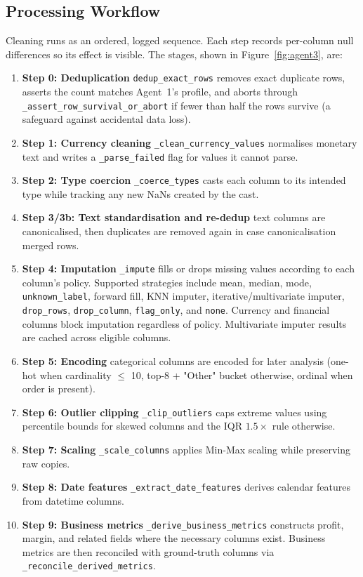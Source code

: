 \documentclass[12pt,a4paper,openany]{report}
\begin{document}
\subsection{Processing Workflow}
Cleaning runs as an ordered, logged sequence. Each step records per-column null differences so its effect is visible. The stages, shown in Figure~\ref{fig:agent3}, are:
\begin{enumerate}
	\item \textbf{Step 0: Deduplication} \texttt{dedup\_exact\_rows} removes exact duplicate rows, asserts the count matches Agent~1's profile, and aborts through \texttt{\_assert\_row\_survival\_or\_abort} if fewer than half the rows survive (a safeguard against accidental data loss).
	\item \textbf{Step 1: Currency cleaning} \texttt{\_clean\_currency\_values} normalises monetary text and writes a \texttt{\_parse\_failed} flag for values it cannot parse.
	\item \textbf{Step 2: Type coercion} \texttt{\_coerce\_types} casts each column to its intended type while tracking any new NaNs created by the cast.
	\item \textbf{Step 3/3b: Text standardisation and re-dedup} text columns are canonicalised, then duplicates are removed again in case canonicalisation merged rows.
	\item \textbf{Step 4: Imputation} \texttt{\_impute} fills or drops missing values according to each column's policy. Supported strategies include mean, median, mode, \texttt{unknown\_label}, forward fill, KNN imputer, iterative/multivariate imputer, \texttt{drop\_rows}, \texttt{drop\_column}, \texttt{flag\_only}, and \texttt{none}. Currency and financial columns block imputation regardless of policy. Multivariate imputer results are cached across eligible columns.
	\item \textbf{Step 5: Encoding} categorical columns are encoded for later analysis (one-hot when cardinality $\le$ 10, top-8 + "Other" bucket otherwise, ordinal when order is present).
	\item \textbf{Step 6: Outlier clipping} \texttt{\_clip\_outliers} caps extreme values using percentile bounds for skewed columns and the IQR $1.5\times$ rule otherwise.
	\item \textbf{Step 7: Scaling} \texttt{\_scale\_columns} applies Min-Max scaling while preserving raw copies.
	\item \textbf{Step 8: Date features} \texttt{\_extract\_date\_features} derives calendar features from datetime columns.
	\item \textbf{Step 9: Business metrics} \texttt{\_derive\_business\_metrics} constructs profit, margin, and related fields where the necessary columns exist. Business metrics are then reconciled with ground-truth columns via \texttt{\_reconcile\_derived\_metrics}.
\end{enumerate}
\end{document}
